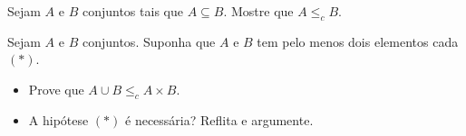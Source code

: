 \begin{exercise}
	Sejam $A$ e $B$ conjuntos tais que $A \subseteq B$. Mostre que $A \leq_c B$.
\end{exercise}

\begin{exercise}
	Sejam $A$ e $B$ conjuntos.
	Suponha que $A$ e $B$ tem pelo menos dois elementos cada $(*)$.
	\begin{itemize}
		\item Prove que $A \cup B \leq_c A \times B$.
		\item A hipótese $(*)$ é necessária? Reflita e argumente.
	\end{itemize}
\end{exercise}